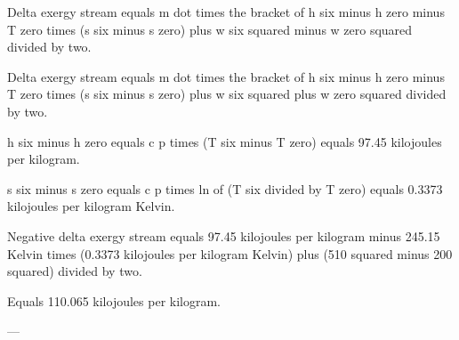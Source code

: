 Delta exergy stream equals m dot times the bracket of h six minus h zero minus T zero times (s six minus s zero) plus w six squared minus w zero squared divided by two.  

Delta exergy stream equals m dot times the bracket of h six minus h zero minus T zero times (s six minus s zero) plus w six squared plus w zero squared divided by two.  

h six minus h zero equals c p times (T six minus T zero) equals 97.45 kilojoules per kilogram.  

s six minus s zero equals c p times ln of (T six divided by T zero) equals 0.3373 kilojoules per kilogram Kelvin.  

Negative delta exergy stream equals 97.45 kilojoules per kilogram minus 245.15 Kelvin times (0.3373 kilojoules per kilogram Kelvin) plus (510 squared minus 200 squared) divided by two.  

Equals 110.065 kilojoules per kilogram.  

---
